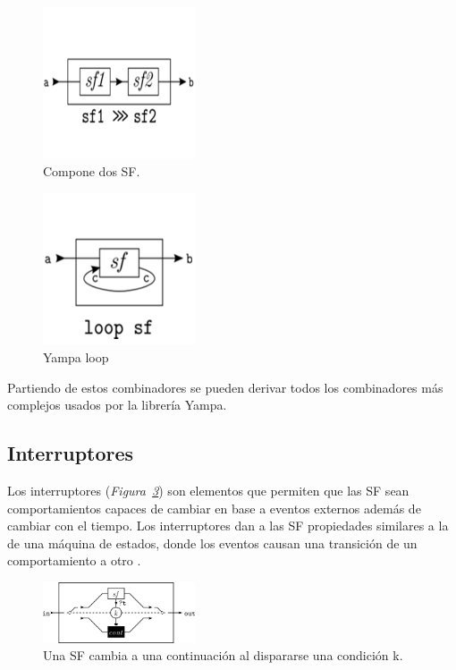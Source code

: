 \begin{figure}[htbp!]
\centering
\includegraphics[width=0.4\textwidth]{Yampa-composition}
\caption[Yampa-composition]{Compone dos SF.}
\label{fig:Yampa-composition}
\end{figure}

\begin{figure}[htbp!]
\centering
\includegraphics[width=0.4\textwidth]{Yampa-loop}
\caption[Yampa-loop]{Yampa loop}
\label{fig:Yampa-loop}
\end{figure}

Partiendo de estos combinadores se pueden derivar todos los combinadores más complejos usados por la librería Yampa.

\subsection{Interruptores}

Los interruptores (\emph{Figura~\ref{fig:Yampa-switch}}) son elementos que permiten que las SF sean comportamientos capaces de cambiar en base a eventos externos además de cambiar con el tiempo. Los interruptores dan a las SF propiedades similares a la de una máquina de estados, donde los eventos causan una transición de un comportamiento a otro \cite{wiki:Yampa}.

\begin{figure}[htbp!]
\centering
\includegraphics[width=0.4\textwidth]{Yampa-switch}
\caption[Yampa-switch]{Una SF cambia a una continuación al dispararse una condición k.}
\label{fig:Yampa-switch}
\end{figure}

